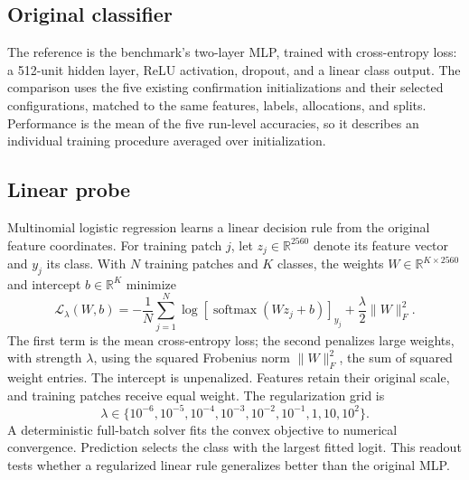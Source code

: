 \documentclass[11pt]{article}
\begin{document}
\subsection{Original classifier}
The reference is the benchmark's two-layer MLP, trained with cross-entropy loss: a 512-unit hidden layer, ReLU activation, dropout, and a linear class output. The comparison uses the five existing confirmation initializations and their selected configurations, matched to the same features, labels, allocations, and splits. Performance is the mean of the five run-level accuracies, so it describes an individual training procedure averaged over initialization.

\subsection{Linear probe}
Multinomial logistic regression learns a linear decision rule from the original feature coordinates. For training patch \(j\), let \(z_j\in\mathbb{R}^{2560}\) denote its feature vector and \(y_j\) its class. With \(N\) training patches and \(K\) classes, the weights \(W\in\mathbb{R}^{K\times2560}\) and intercept \(b\in\mathbb{R}^{K}\) minimize
\begin{equation}
\mathcal{L}_{\lambda}(W,b)
= -\frac{1}{N}\sum_{j=1}^{N}
\log\left[\operatorname{softmax}(Wz_j+b)\right]_{y_j}
+\frac{\lambda}{2}\lVert W\rVert_F^2.
\label{eq:linear}
\end{equation}
\noindent The first term is the mean cross-entropy loss; the second penalizes large weights, with strength \(\lambda\), using the squared Frobenius norm \(\lVert W\rVert_F^2\), the sum of squared weight entries. The intercept is unpenalized. Features retain their original scale, and training patches receive equal weight. The regularization grid is
\begin{equation}
\lambda\in\{10^{-6},10^{-5},10^{-4},10^{-3},10^{-2},10^{-1},1,10,10^{2}\}.
\label{eq:lambda}
\end{equation}
\noindent A deterministic full-batch solver fits the convex objective to numerical convergence. Prediction selects the class with the largest fitted logit. This readout tests whether a regularized linear rule generalizes better than the original MLP.
\end{document}
